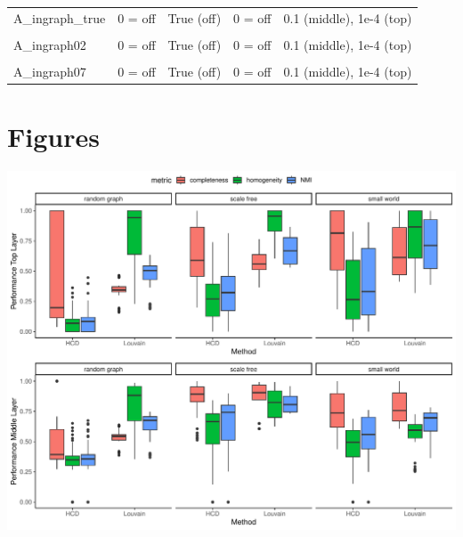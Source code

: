 \documentclass[
]{article}
\begin{document}
\begin{longtable}[t]{>{\raggedright\arraybackslash}p{8em}llll}
\addlinespace
A\_ingraph\_true & 0 = off & True (off) & 0 = off & 0.1 (middle), 1e-4 (top)\\
\cellcolor{gray!10}{A\_corr\_no\_cutoff} & \cellcolor{gray!10}{0 = off} & \cellcolor{gray!10}{True (off)} & \cellcolor{gray!10}{0 = off} & \cellcolor{gray!10}{0.1 (middle), 1e-4 (top)}\\
A\_ingraph02 & 0 = off & True (off) & 0 = off & 0.1 (middle), 1e-4 (top)\\
\cellcolor{gray!10}{A\_ingraph05} & \cellcolor{gray!10}{0 = off} & \cellcolor{gray!10}{True (off)} & \cellcolor{gray!10}{0 = off} & \cellcolor{gray!10}{0.1 (middle), 1e-4 (top)}\\
A\_ingraph07 & 0 = off & True (off) & 0 = off & 0.1 (middle), 1e-4 (top)\\
\bottomrule
\end{longtable}
\endgroup{}
\endgroup{}

\newpage
\section*{Figures}

\includegraphics{Lab_report_4_1_2024_files/figure-latex/fig1-1.pdf}
\end{document}

